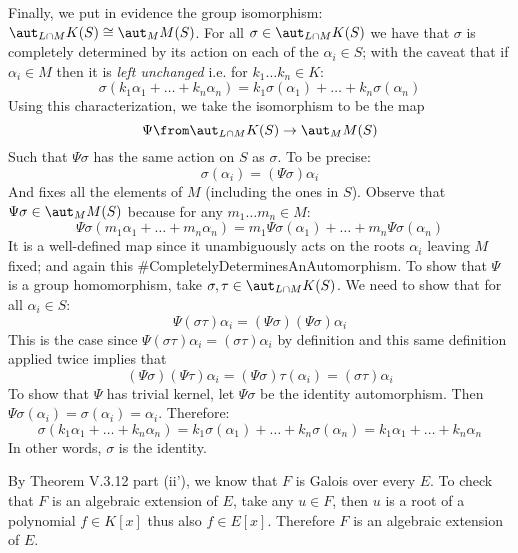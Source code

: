 Finally, we put in evidence the group isomorphism: $\aut_{L\cap M} K(S) \cong \aut_MM(S)$. 
For all $\sigma \in \aut_{L\cap M} K(S)$ we have that $\sigma$ is completely determined by its action on each of the $\alpha_i \in S$; with the caveat that if $\alpha_i \in M$ then it is \emph{left unchanged} i.e. for $k_1\ldots k_n \in K$:
$$\sigma(k_1 \alpha_1+\ldots + k_n \alpha_n) = k_1 \sigma(\alpha_1)+\ldots +  k_n \sigma(\alpha_n)$$
Using this characterization, we take the isomorphism to be the map 
$$\Psi \from \aut_{L\cap M} K(S) \to \aut_MM(S)$$
Such that  $\Psi\sigma$ has the same action on $S$ as $\sigma$. To be precise:
$$\sigma(\alpha_i)=(\Psi\sigma)\alpha_i$$
And fixes all the elements of $M$ (including the ones in $S$). Observe that $\Psi\sigma\in \aut_MM(S)$ because for any $m_1\ldots m_n \in M$:
$$\Psi\sigma(m_1 \alpha_1+\ldots + m_n \alpha_n) = m_1 \Psi\sigma(\alpha_1)+\ldots +  m_n \Psi\sigma(\alpha_n)$$
It is a well-defined map since it unambiguously acts on the roots $\alpha_i$ leaving $M$ fixed; and again this \#CompletelyDeterminesAnAutomorphism.
To show that $\Psi$ is a group homomorphism, take $\sigma, \tau\in   \aut_{L\cap M} K(S)$. We need to show that for all $\alpha_i \in S$:
$$\Psi(\sigma \tau)\alpha_i= (\Psi\sigma)(\Psi\sigma)\alpha_i$$   
This is the case since $\Psi(\sigma \tau)\alpha_i =(\sigma\tau)\alpha_i$ by definition and this same definition applied twice implies that 
$$(\Psi\sigma)(\Psi\tau)\alpha_i=(\Psi\sigma)\tau (\alpha_i)=(\sigma\tau)\alpha_i$$
To show that $\Psi$ has trivial kernel, let $\Psi\sigma$ be the identity automorphism. Then $\Psi\sigma(\alpha_i) = \sigma(\alpha_i)=\alpha_i$. Therefore: 
$$\sigma(k_1 \alpha_1+\ldots + k_n \alpha_n) = k_1 \sigma(\alpha_1)+\ldots +  k_n \sigma(\alpha_n)=k_1 \alpha_1+\ldots + k_n \alpha_n$$
In other words, $\sigma$ is the identity.

By Theorem V.3.12 part (ii'), we know that $F$ is Galois over every $E$. To check that $F$ is an algebraic extension of $E$, take any $u\in F$, then $u$ is a root of a polynomial  $f\in K[x]$ thus also  $f\in E[x]$. Therefore $F$ is an algebraic extension of $E$.

